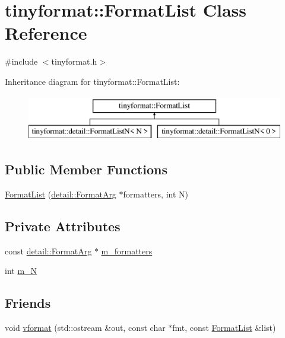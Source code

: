 \hypertarget{classtinyformat_1_1_format_list}{}\section{tinyformat\+:\+:Format\+List Class Reference}
\label{classtinyformat_1_1_format_list}


{\ttfamily \#include $<$tinyformat.\+h$>$}

Inheritance diagram for tinyformat\+:\+:Format\+List\+:\begin{figure}[H]
\begin{center}
\leavevmode
\includegraphics[height=2.000000cm]{classtinyformat_1_1_format_list}
\end{center}
\end{figure}
\subsection*{Public Member Functions}
\begin{DoxyCompactItemize}
\item 
\mbox{\hyperlink{classtinyformat_1_1_format_list_a4dc93948fa7b945665800b5c147037c3}{Format\+List}} (\mbox{\hyperlink{classtinyformat_1_1detail_1_1_format_arg}{detail\+::\+Format\+Arg}} $\ast$formatters, int N)
\end{DoxyCompactItemize}
\subsection*{Private Attributes}
\begin{DoxyCompactItemize}
\item 
const \mbox{\hyperlink{classtinyformat_1_1detail_1_1_format_arg}{detail\+::\+Format\+Arg}} $\ast$ \mbox{\hyperlink{classtinyformat_1_1_format_list_a90b0b9b03a90c09e8734b51f8be3f734}{m\+\_\+formatters}}
\item 
int \mbox{\hyperlink{classtinyformat_1_1_format_list_aee4267e50285b7adeb57b61d6305312b}{m\+\_\+N}}
\end{DoxyCompactItemize}
\subsection*{Friends}
\begin{DoxyCompactItemize}
\item 
void \mbox{\hyperlink{classtinyformat_1_1_format_list_a105eb7b498f1353f8da108bd7284af58}{vformat}} (std\+::ostream \&out, const char $\ast$fmt, const \mbox{\hyperlink{classtinyformat_1_1_format_list}{Format\+List}} \&list)
\end{DoxyCompactItemize}


